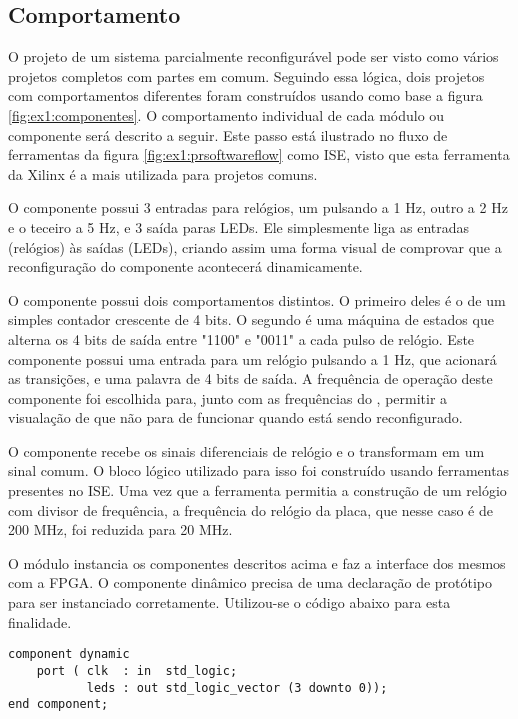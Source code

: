 \documentclass[11pt,a4paper,oneside]{book}
\begin{document}
\subsection{Comportamento}
O projeto de um sistema parcialmente reconfigurável pode ser visto como vários projetos completos com partes em comum.
Seguindo essa lógica, dois projetos com comportamentos diferentes foram construídos usando como base a figura \ref{fig:ex1:componentes}.
O comportamento individual de cada módulo ou componente será descrito a seguir.
Este passo está ilustrado no fluxo de ferramentas da figura \ref{fig:ex1:prsoftwareflow} como ISE, visto que esta ferramenta da Xilinx é a mais utilizada para projetos comuns.

O componente  possui 3 entradas para relógios, um pulsando a 1 Hz, outro a 2 Hz e o teceiro a 5 Hz, e 3 saída paras LEDs.
Ele simplesmente liga as entradas (relógios) às saídas (LEDs), criando assim uma forma visual de comprovar que a reconfiguração do componente  acontecerá dinamicamente.

O componente  possui dois comportamentos distintos.
O primeiro deles é o de um simples contador crescente de 4 bits.
O segundo é uma máquina de estados que alterna os 4 bits de saída entre "1100" e "0011" a cada pulso de relógio.
Este componente possui uma entrada para um relógio pulsando a 1 Hz, que acionará as transições, e uma palavra de 4 bits de saída.
A frequência de operação deste componente foi escolhida para, junto com as frequências do , permitir a visualação de que  não para de funcionar quando  está sendo reconfigurado.

O componente  recebe os sinais diferenciais de relógio e o transformam em um sinal comum.
O bloco lógico utilizado para isso foi construído usando ferramentas presentes no ISE.
Uma vez que a ferramenta permitia a construção de um relógio com divisor de frequência, a frequência do relógio da placa, que nesse caso é de 200 MHz, foi reduzida para 20 MHz.

O módulo  instancia os componentes descritos acima e faz a interface dos mesmos com a FPGA.
O componente dinâmico precisa de uma declaração de protótipo para ser instanciado corretamente.
Utilizou-se o código abaixo para esta finalidade.
\begin{lstlisting}[style=customVHDL]
component dynamic
    port ( clk  : in  std_logic;
           leds : out std_logic_vector (3 downto 0));
end component;
\end{lstlisting}
\end{document}

